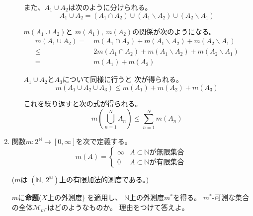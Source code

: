\documentclass[12pt,b5paper]{ltjsarticle}
\begin{document}
\begin{enumerate}
\begin{enumerate}
            また、$A_{1}\cup A_{2}$は次のように分けられる。
            \begin{equation}
             A_{1}\cup A_{2}
              =
              (A_{1}\cap A_{2})
              \cup (A_{1}\backslash A_{2})
              \cup (A_{2}\backslash A_{1})
            \end{equation}

            $m(A_{1}\cup A_{2})$と
            $m(A_{1}),\ m(A_{2})$の関係が次のようになる。
            \begin{align}
             m(A_{1}\cup A_{2})
             =& \
              m(A_{1}\cap A_{2}) + m(A_{1}\backslash A_{2}) + m(A_{2}\backslash A_{1})\\
             \leq &\
              2 m(A_{1}\cap A_{2}) + m(A_{1}\backslash A_{2}) + m(A_{2}\backslash A_{1})\\
             =& \ m(A_{1}) + m(A_{2})
            \end{align}

            $A_{1}\cup A_{2}$と$A_{3}$について同様に行うと
            次が得られる。
            \begin{equation}
             m(A_{1}\cup A_{2} \cup A_{3}) \leq m(A_{1}) + m(A_{2}) + m(A_{3})
            \end{equation}

            これを繰り返すと次の式が得られる。
            \begin{equation}
             m\left( \bigcup_{n=1}^{N}A_{n} \right) \leq \sum_{n=1}^{N}m(A_{n})
            \end{equation}

            \hrulefill

      \end{enumerate}

 \item
      関数$m:2^{\mathbb{N}}\to[0,\infty]$を次で定義する。
      \begin{equation}
       m(A)=
       \begin{cases}
        \infty & A\subset\mathbb{N}が無限集合\\
        0 & A\subset\mathbb{N}が有限集合
       \end{cases}
      \end{equation}

      ($m$は
      $(\mathbb{N},\ 2^{\mathbb{N}})$上の有限加法的測度である。)

      $m$に\textbf{命題}($X$上の外測度)
      を適用し、
      $\mathbb{N}$上の外測度$m^{*}$を得る。
      $m^{*}$-可測な集合の全体$\mathcal{M}_{m^{*}}$はどのようなものか。
      理由をつけて答えよ。


\end{enumerate}
\end{document}
